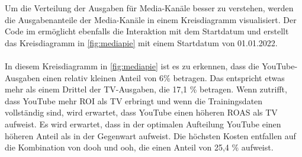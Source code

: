 \noindent
Um die Verteilung der Ausgaben für Media-Kanäle besser zu verstehen, werden die Ausgabenanteile der Media-Kanäle in einem Kreisdiagramm visualisiert. Der Code im  ermöglicht ebenfalls die Interaktion mit dem Startdatum und erstellt das Kreisdiagramm in \autoref{fig:mediapie} mit einem Startdatum von 01.01.2022.\\\\
In diesem Kreisdiagramm in \autoref{fig:mediapie} ist es zu erkennen, dass die YouTube-Ausgaben einen relativ kleinen Anteil von 6\% betragen. Das entspricht etwas mehr als einem Drittel der TV-Ausgaben, die 17,1 \% betragen. Wenn  zutrifft, dass YouTube mehr \ac{ROI} als TV erbringt und wenn die Trainingsdaten vollständig sind, wird erwartet, dass YouTube einen höheren \ac{ROAS} als TV aufweist. Es wird erwartet, dass in der optimalen Aufteilung YouTube einen höheren Anteil als in der Gegenwart aufweist. Die höchsten Kosten entfallen auf die Kombination von \ac{dooh} und \ac{ooh}, die einen Anteil von 25,4 \% aufweist.
\newpage
